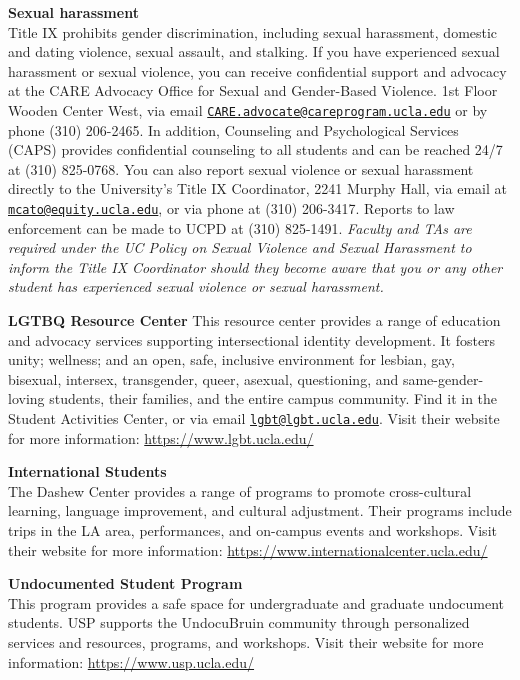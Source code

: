 \documentclass[11pt,]{article}
\begin{document}
\textbf{Sexual harassment}\\
Title IX prohibits gender discrimination, including sexual harassment,
domestic and dating violence, sexual assault, and stalking. If you have
experienced sexual harassment or sexual violence, you can receive
confidential support and advocacy at the CARE Advocacy Office for Sexual
and Gender-Based Violence. 1st Floor Wooden Center West, via email
\href{mailto:CARE.advocate@careprogram.ucla.edu}{\nolinkurl{CARE.advocate@careprogram.ucla.edu}}
or by phone (310) 206-2465. In addition, Counseling and Psychological
Services (CAPS) provides confidential counseling to all students and can
be reached 24/7 at (310) 825-0768. You can also report sexual violence
or sexual harassment directly to the University's Title IX Coordinator,
2241 Murphy Hall, via email at
\href{mailto:mcato@equity.ucla.edu}{\nolinkurl{mcato@equity.ucla.edu}},
or via phone at (310) 206-3417. Reports to law enforcement can be made
to UCPD at (310) 825-1491. \emph{Faculty and TAs are required under the
UC Policy on Sexual Violence and Sexual Harassment to inform the Title
IX Coordinator should they become aware that you or any other student
has experienced sexual violence or sexual harassment.}

\textbf{LGTBQ Resource Center} This resource center provides a range of
education and advocacy services supporting intersectional identity
development. It fosters unity; wellness; and an open, safe, inclusive
environment for lesbian, gay, bisexual, intersex, transgender, queer,
asexual, questioning, and same-gender-loving students, their families,
and the entire campus community. Find it in the Student Activities
Center, or via email
\href{mailto:lgbt@lgbt.ucla.edu}{\nolinkurl{lgbt@lgbt.ucla.edu}}. Visit
their website for more information: \url{https://www.lgbt.ucla.edu/}

\textbf{International Students}\\
The Dashew Center provides a range of programs to promote cross-cultural
learning, language improvement, and cultural adjustment. Their programs
include trips in the LA area, performances, and on-campus events and
workshops. Visit their website for more information:
\url{https://www.internationalcenter.ucla.edu/}

\textbf{Undocumented Student Program}\\
This program provides a safe space for undergraduate and graduate
undocument students. USP supports the UndocuBruin community through
personalized services and resources, programs, and workshops. Visit
their website for more information: \url{https://www.usp.ucla.edu/}
\end{document}
